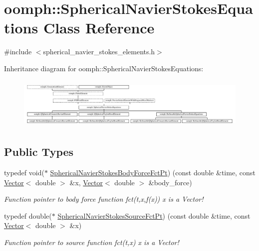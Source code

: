 \hypertarget{classoomph_1_1SphericalNavierStokesEquations}{}\section{oomph\+:\+:Spherical\+Navier\+Stokes\+Equations Class Reference}
\label{classoomph_1_1SphericalNavierStokesEquations}


{\ttfamily \#include $<$spherical\+\_\+navier\+\_\+stokes\+\_\+elements.\+h$>$}

Inheritance diagram for oomph\+:\+:Spherical\+Navier\+Stokes\+Equations\+:\begin{figure}[H]
\begin{center}
\leavevmode
\includegraphics[height=2.507463cm]{classoomph_1_1SphericalNavierStokesEquations}
\end{center}
\end{figure}
\subsection*{Public Types}
\begin{DoxyCompactItemize}
\item 
typedef void($\ast$ \hyperlink{classoomph_1_1SphericalNavierStokesEquations_aee36bea87063e9648a488de9e21f551d}{Spherical\+Navier\+Stokes\+Body\+Force\+Fct\+Pt}) (const double \&time, const \hyperlink{classoomph_1_1Vector}{Vector}$<$ double $>$ \&x, \hyperlink{classoomph_1_1Vector}{Vector}$<$ double $>$ \&body\+\_\+force)
\begin{DoxyCompactList}\small\item\em Function pointer to body force function fct(t,x,f(x)) x is a Vector! \end{DoxyCompactList}\item 
typedef double($\ast$ \hyperlink{classoomph_1_1SphericalNavierStokesEquations_abd522fea532c3de15dbe80205e53bdf8}{Spherical\+Navier\+Stokes\+Source\+Fct\+Pt}) (const double \&time, const \hyperlink{classoomph_1_1Vector}{Vector}$<$ double $>$ \&x)
\begin{DoxyCompactList}\small\item\em Function pointer to source function fct(t,x) x is a Vector! \end{DoxyCompactList}\end{DoxyCompactItemize}
